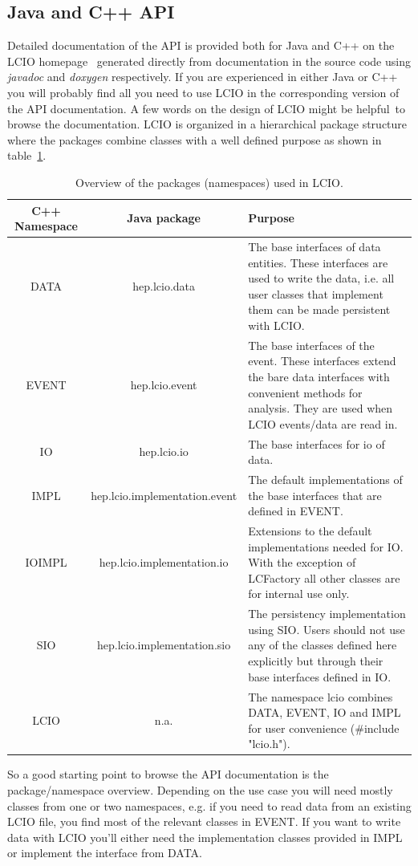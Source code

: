 \documentclass[twoside]{article}
\begin{document}
\subsection{Java and C++ API} \label{sec_api}
Detailed documentation of the API is provided both for Java and C++ on the 
LCIO homepage~\cite{lcio_home} generated directly  from documentation in the source code using 
{\em javadoc} and {\em doxygen} respectively.   
If you are experienced in either Java or C++ you will probably 
find all you need to use LCIO in the corresponding version of the API documentation.
A few words on the design of LCIO might be helpful\ to browse the documentation.
LCIO is organized in a hierarchical package structure where the packages combine classes
with a well defined purpose as shown in table~\ref{tab_pkg}.  
\begin{table}
\begin{center}
\begin{tabular}{|c|c|p{6cm}|}
\hline
\rule[-5mm]{0mm}{10mm} C++ Namespace  &  Java package    &  Purpose \\ \hline \hline

 DATA  &  hep.lcio.data   &  The base interfaces of data entities.
 These interfaces are used to write the data, i.e. all user classes 
 that implement them can be made persistent with LCIO.\\ \hline
 EVENT  &  hep.lcio.event   & The base interfaces of the event.
 These interfaces extend the bare data interfaces with convenient 
 methods for analysis. They are used when LCIO events/data are read in. \\ \hline
 IO  &  hep.lcio.io   &  The base interfaces for io of data.\\ \hline
 IMPL  &  hep.lcio.implementation.event   & The default implementations of
 the base interfaces that are defined in EVENT. \\ \hline
 IOIMPL  &  hep.lcio.implementation.io   &  Extensions to the default implementations
 needed for IO. With the exception of LCFactory all other classes are for internal use only.\\ \hline
 SIO  &  hep.lcio.implementation.sio   & The persistency implementation using SIO.
 Users should not use any of the classes defined here explicitly but through their
 base interfaces defined in IO. \\ \hline
 LCIO  &   n.a. & The namespace lcio combines DATA, EVENT, IO and IMPL for user convenience
(\#include "lcio.h"). \\ \hline

\end{tabular}
\end{center}
\caption{Overview of the packages (namespaces) used in LCIO.}
\label{tab_pkg}
\end{table}
So a good starting point to browse the API documentation is the package/namespace overview.
Depending on the use case you will need mostly classes from one or two namespaces, e.g. if you need 
to read data from an existing LCIO file, you find most of the relevant classes in EVENT.
If you want to write data with LCIO you'll either need the implementation classes provided in IMPL
or implement the interface from DATA.
\end{document}
